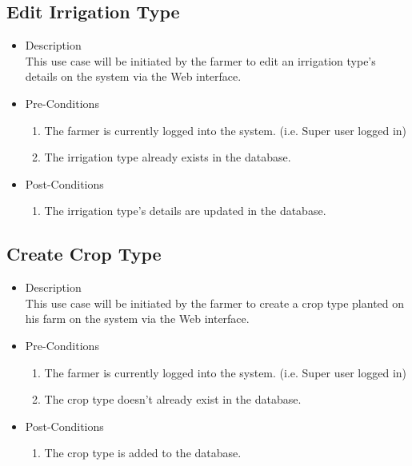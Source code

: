\documentclass[11pt,fleqn]{book} %
\begin{document}
	\subsection{Edit Irrigation Type}
	\begin{itemize}
		\item Description\\
		This use case will be initiated by the farmer to edit an irrigation type’s details on the system via the Web interface.
		\item Pre-Conditions
		\begin{enumerate}
			\item The farmer is currently logged into the system. (i.e. Super user logged in)
			\item The irrigation type already exists in the database.					
		\end{enumerate}
		\item Post-Conditions
		\begin{enumerate}
			\item The irrigation type’s details are updated in the database.
		\end{enumerate}
	\end{itemize}
	
	\subsection{Create Crop Type}
	\begin{itemize}
		\item Description\\
		This use case will be initiated by the farmer to create a crop type planted on his farm on the system via the Web interface.
		\item Pre-Conditions
		\begin{enumerate}
			\item The farmer is currently logged into the system. (i.e. Super user logged in)
			\item The crop type doesn’t already exist in the database. 
		\end{enumerate}
		\item Post-Conditions
		\begin{enumerate}
			\item The crop type is added to the database.
		\end{enumerate}
	\end{itemize}
	
\end{document}
